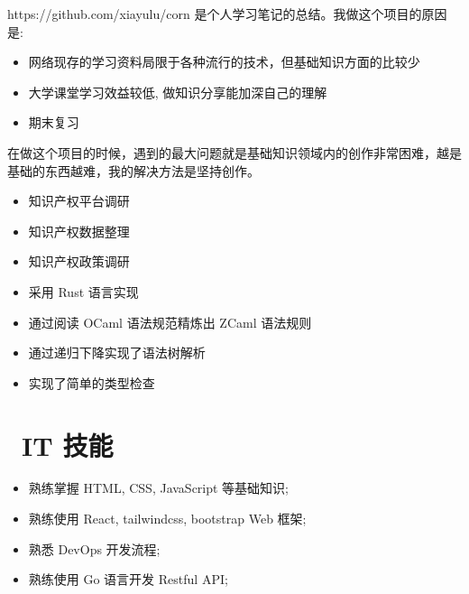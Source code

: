 \documentclass{resume}
\begin{document}
https://github.com/xiayulu/corn 是个人学习笔记的总结。我做这个项目的原因是:
\begin{itemize}
  \item 网络现存的学习资料局限于各种流行的技术，但基础知识方面的比较少
  \item 大学课堂学习效益较低, 做知识分享能加深自己的理解
  \item 期末复习
\end{itemize}

在做这个项目的时候，遇到的最大问题就是基础知识领域内的创作非常困难，越是基础的东西越难，我的解决方法是坚持创作。

\begin{itemize}
  \item 知识产权平台调研
  \item 知识产权数据整理
  \item 知识产权政策调研
\end{itemize}

\begin{itemize}
  \item 采用 Rust 语言实现
  \item 通过阅读 OCaml 语法规范精炼出 ZCaml 语法规则
  \item 通过递归下降实现了语法树解析
  \item 实现了简单的类型检查
\end{itemize}


\section{\faCogs\ IT 技能}
\begin{itemize}[parsep=0.5ex]
  \item 熟练掌握 HTML, CSS, JavaScript 等基础知识;
  \item 熟练使用 React, tailwindcss, bootstrap Web 框架;
  \item 熟悉 DevOps 开发流程;
  \item 熟练使用 Go 语言开发 Restful API;
\end{itemize}
\end{document}
